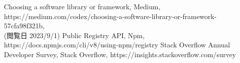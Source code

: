 \documentclass[main]{subfiles}
\begin{document}
\begin{thebibliography}{9}\setlength{\itemsep}{-2pt}
 Choosing a software library or framework, Medium,\\ https://medium.com/codex/choosing-a-software-library-or-framework-57cfa98f321b,\\ (閲覧日 2023/9/1) 
 Public Registry API, Npm,\\ https://docs.npmjs.com/cli/v8/using-npm/registry
 Stack Overflow Annual Developer Survey, Stack Overflow, https://insights.stackoverflow.com/survey
\end{thebibliography}
\end{document}
